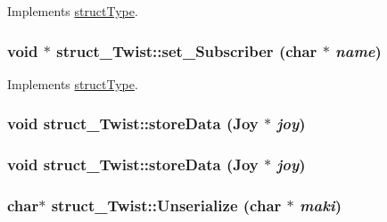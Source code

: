 Implements \hyperlink{classstructType_aa017fe323160d25667ed838023db944d}{structType}.

\hypertarget{classstruct__Twist_ae87a3d1851c29e2707ae7bd35fac323b}{
\subsubsection[{set\_\-Subscriber}]{\setlength{\rightskip}{0pt plus 5cm}void $\ast$ struct\_\-Twist::set\_\-Subscriber (char $\ast$ {\em name})}}
\label{classstruct__Twist_ae87a3d1851c29e2707ae7bd35fac323b}


Implements \hyperlink{classstructType_a2f5adefc54e1e0f5a9100ab78e3c3749}{structType}.

\hypertarget{classstruct__Twist_a0385da1a9307377c97fd0bee2c94f1f6}{
\subsubsection[{storeData}]{\setlength{\rightskip}{0pt plus 5cm}void struct\_\-Twist::storeData ({\bf Joy} $\ast$ {\em joy})}}
\label{classstruct__Twist_a0385da1a9307377c97fd0bee2c94f1f6}
\hypertarget{classstruct__Twist_a0385da1a9307377c97fd0bee2c94f1f6}{
\subsubsection[{storeData}]{\setlength{\rightskip}{0pt plus 5cm}void struct\_\-Twist::storeData ({\bf Joy} $\ast$ {\em joy})}}
\label{classstruct__Twist_a0385da1a9307377c97fd0bee2c94f1f6}
\hypertarget{classstruct__Twist_a69b1008d4218c372a14b7ce1e8d6d485}{
\subsubsection[{Unserialize}]{\setlength{\rightskip}{0pt plus 5cm}char$\ast$ struct\_\-Twist::Unserialize (char $\ast$ {\em maki})}}
\label{classstruct__Twist_a69b1008d4218c372a14b7ce1e8d6d485}


